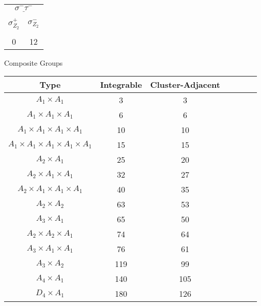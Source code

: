 \documentclass[12pt]{article}
\begin{document}
\begin{center}
\hspace{1.2cm}
\begin{tabular}{| c | c |}
\multicolumn{2}{c}{$\underline{\sigma^- \tau^-}$} \\[-1em]
\multicolumn{1}{c}{} & \multicolumn{1}{c}{} \\
\multicolumn{1}{c}{$\sigma_{Z_2}^+$} & \multicolumn{1}{c}{$\sigma_{Z_2}^-$} \\[-1em]
\multicolumn{1}{c}{} & \multicolumn{1}{c}{} \\
\hline
0 & 12 \\
\hline
\end{tabular} 
\vspace{.6cm}

\newpage
Composite Groups

\begin{tabular}{ | c | c | c | c | c | c |  c |}
\multicolumn{1}{c}{Type} & \multicolumn{1}{c}{Integrable} & \multicolumn{1}{c}{Cluster-Adjacent} \\
\hline \( A_1 \times A_1 \) & 3 & 3  \\ 
\hline \( A_1 \times A_1 \times A_1 \) & 6 & 6  \\ 
\hline \( A_1 \times A_1 \times A_1 \times A_1 \) & 10 & 10  \\ 
\hline \( A_1 \times A_1 \times A_1 \times A_1 \times A_1 \) & 15 & 15  \\ 
\hline \( A_2 \times A_1 \) & 25 & 20  \\ 
\hline \( A_2 \times A_1 \times A_1 \) & 32 & 27  \\ 
\hline \( A_2 \times A_1 \times A_1 \times A_1 \) & 40 & 35  \\ 
\hline \( A_2 \times A_2 \) & 63 & 53  \\ 
\hline \( A_3 \times A_1 \) & 65 & 50  \\ 
\hline \( A_2 \times A_2 \times A_1 \) & 74 & 64  \\ 
\hline \( A_3 \times A_1 \times A_1 \) & 76 & 61  \\ 
\hline \( A_3 \times A_2 \) & 119 & 99  \\ 
\hline \( A_4 \times A_1 \) & 140 & 105  \\ 
\hline \( D_4 \times A_1 \) & 180 & 126  \\ 
\hline
\end{tabular}
\vspace{.6cm}


\end{center}
\end{document}
